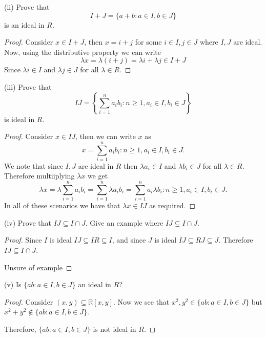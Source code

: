 \documentclass{article}
\newcommand{\R}{\mathbb{R}}
\newenvironment{hwproof}[1]
{
    #1
    \begin{proof}
}{
    \end{proof}
}
\begin{document}
\begin{hwproof}
    {
        (ii) Prove that
        \begin{equation*}
            I + J = \{a + b : a \in I, b \in J\}
        \end{equation*}
        is an ideal in $R$.
    }
    Consider $x \in I + J$, then $x = i + j$ for some $i \in I, j \in J$ where
    $I, J$ are ideal.
    Now, using the distributive property we can write
    \[\lambda x = \lambda(i + j) = \lambda i + \lambda j \in I + J\]
    Since $\lambda i \in I$ and $\lambda j \in J$ for all $\lambda \in R$.
\end{hwproof}

\begin{hwproof}
    {
        (iii) Prove that
        \begin{equation*}
            IJ = \left\{\sum_{i=1}^n a_ib_i : n \geq 1, a_i \in I, b_i \in J\right\}
        \end{equation*}
        is ideal in $R$.
    }
    Consider $x \in IJ$, then we can write $x$ as
    \begin{equation*}
        x = \sum_{i=1}^n a_ib_i : n \geq 1, a_i \in I, b_i \in J.
    \end{equation*}
    We note that since $I, J$ are ideal in $R$ then $\lambda a_i \in I$ and
    $\lambda b_i \in J$ for all $\lambda \in R$. Therefore multiiplying $\lambda x$
    we get
    \begin{equation*}
        \lambda x = \lambda \sum_{i=1}^n a_ib_i =
        \sum_{i=1}^n \lambda a_ib_i =
        \sum_{i=1}^n a_i\lambda b_i   : n \geq 1, a_i \in I, b_i \in J.
    \end{equation*}
    In all of these scenarios we have that $\lambda x \in IJ$ as required.
\end{hwproof}

\begin{hwproof}
    {
        (iv) Prove that $IJ \subseteq I \cap J$. Give an example where
        $IJ \subsetneq I \cap J$.
    }
    Since $I$ is ideal $IJ \subseteq IR \subseteq I$, and since $J$ is ideal
    $IJ \subseteq RJ \subseteq J$. Therefore $IJ \subseteq I \cap J$.

    Unsure of example

\end{hwproof}

\begin{hwproof}
    {
        (v) Is $\{ab : a \in I, b \in J\}$ an ideal in $R$?
    }
    Consider $(x,y) \subseteq \R[x,y]$. Now we see that
    $x^2, y^2 \in \{ab : a \in I, b \in J\}$ but
    $x^2 + y^2 \notin \{ab : a \in I, b \in J\}$.

    Therefore, $\{ab : a \in I, b \in J\}$ is not ideal in $R$.

\end{hwproof}
\end{document}
